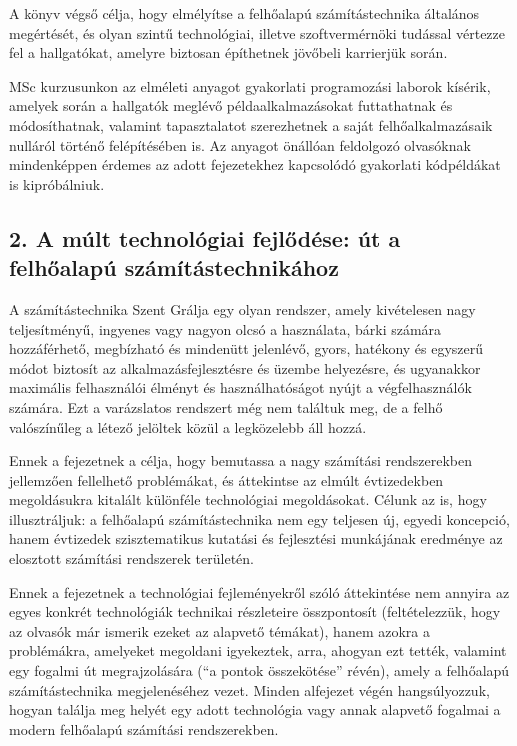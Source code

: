 \documentclass[
]{article}
\begin{document}
A könyv végső célja, hogy elmélyítse a felhőalapú számítástechnika
általános megértését, és olyan szintű technológiai, illetve
szoftvermérnöki tudással vértezze fel a hallgatókat, amelyre biztosan
építhetnek jövőbeli karrierjük során.

MSc kurzusunkon az elméleti anyagot gyakorlati programozási laborok
kísérik, amelyek során a hallgatók meglévő példaalkalmazásokat
futtathatnak és módosíthatnak, valamint tapasztalatot szerezhetnek a
saját felhőalkalmazásaik nulláról történő felépítésében is. Az anyagot
önállóan feldolgozó olvasóknak mindenképpen érdemes az adott
fejezetekhez kapcsolódó gyakorlati kódpéldákat is kipróbálniuk.

\hypertarget{a-muxfalt-technoluxf3giai-fejlux151duxe9se-uxfat-a-felhux151alapuxfa-szuxe1muxedtuxe1stechnikuxe1hoz}{%
\subsection{2. A múlt technológiai fejlődése: út a felhőalapú
számítástechnikához}\label{a-muxfalt-technoluxf3giai-fejlux151duxe9se-uxfat-a-felhux151alapuxfa-szuxe1muxedtuxe1stechnikuxe1hoz}}

A számítástechnika Szent Grálja egy olyan rendszer, amely kivételesen
nagy teljesítményű, ingyenes vagy nagyon olcsó a használata, bárki
számára hozzáférhető, megbízható és mindenütt jelenlévő, gyors, hatékony
és egyszerű módot biztosít az alkalmazásfejlesztésre és üzembe
helyezésre, és ugyanakkor maximális felhasználói élményt és
használhatóságot nyújt a végfelhasználók számára. Ezt a varázslatos
rendszert még nem találtuk meg, de a felhő valószínűleg a létező
jelöltek közül a legközelebb áll hozzá.

Ennek a fejezetnek a célja, hogy bemutassa a nagy számítási
rendszerekben jellemzően fellelhető problémákat, és áttekintse az elmúlt
évtizedekben megoldásukra kitalált különféle technológiai megoldásokat.
Célunk az is, hogy illusztráljuk: a felhőalapú számítástechnika nem egy
teljesen új, egyedi koncepció, hanem évtizedek szisztematikus kutatási
és fejlesztési munkájának eredménye az elosztott számítási rendszerek
területén.

Ennek a fejezetnek a technológiai fejleményekről szóló áttekintése nem
annyira az egyes konkrét technológiák technikai részleteire összpontosít
(feltételezzük, hogy az olvasók már ismerik ezeket az alapvető témákat),
hanem azokra a problémákra, amelyeket megoldani igyekeztek, arra,
ahogyan ezt tették, valamint egy fogalmi út megrajzolására (``a pontok
összekötése'' révén), amely a felhőalapú számítástechnika megjelenéséhez
vezet. Minden alfejezet végén hangsúlyozzuk, hogyan találja meg helyét
egy adott technológia vagy annak alapvető fogalmai a modern felhőalapú
számítási rendszerekben.
\end{document}
